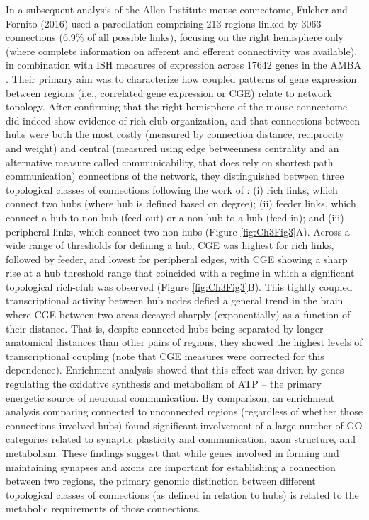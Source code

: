 In a subsequent analysis of the Allen Institute mouse connectome, Fulcher and Fornito (2016) used a parcellation comprising 213 regions linked by 3063 connections (6.9\% of all possible links), focusing on the right hemisphere only (where complete information on afferent and efferent connectivity was available), in combination with ISH measures of expression across \num{17642} genes in the AMBA \citep{Lein2007a}.
Their primary aim was to characterize how coupled patterns of gene expression between regions (i.e., correlated gene expression or CGE) relate to network topology. After confirming that the right hemisphere of the mouse connectome did indeed show evidence of rich-club organization, and that connections between hubs were both the most costly (measured by connection distance, reciprocity and weight) and central (measured using edge betweenness centrality and an alternative measure called communicability, that does rely on shortest path communication) connections of the network, they distinguished between three topological classes of connections following the work of \citet{VandenHeuvel2012}: (i) rich links, which connect two hubs (where hub is defined based on degree); (ii) feeder links, which connect a hub to non-hub (feed-out) or a non-hub to a hub (feed-in);
and (iii) peripheral links, which connect two non-hubs (Figure \ref{fig:Ch3Fig3}A).
Across a wide range of thresholds for defining a hub, CGE was highest for rich links, followed by feeder, and lowest for peripheral edges, with CGE showing a sharp rise at a hub threshold range that coincided with a regime in which a significant topological rich-club was observed (Figure \ref{fig:Ch3Fig3}B). This tightly coupled transcriptional activity between hub nodes defied a general trend in the brain where CGE between two areas decayed sharply (exponentially) as a function of their distance. That is, despite connected hubs being separated by longer anatomical distances than other pairs of regions, they showed the highest levels of transcriptional coupling (note that CGE measures were corrected for this dependence).
Enrichment analysis showed that this effect was driven by genes regulating the oxidative synthesis and metabolism of ATP -- the primary energetic source of neuronal communication. By comparison, an enrichment analysis comparing connected to unconnected regions (regardless of whether those connections involved hubs) found significant involvement of a large number of GO categories related to synaptic plasticity and communication, axon structure, and metabolism. These findings suggest that while genes involved in forming and maintaining synapses and axons are important for establishing a connection between two regions, the primary genomic distinction between different topological classes of connections (as defined in relation to hubs) is related to the metabolic requirements of those connections.

